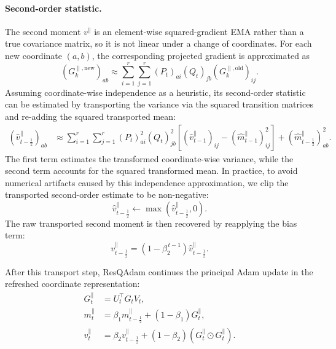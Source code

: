 \documentclass{article} %
\begin{document}
\paragraph{Second-order statistic.}
The second moment $v^{\parallel}$ is an element-wise squared-gradient EMA rather than a true covariance matrix, so it is not linear under a change of coordinates. For each new coordinate $(a,b)$, the corresponding projected gradient is approximated as
\begin{equation}
    \left(G_k^{\parallel,\mathrm{new}}\right)_{ab}
    \approx
    \sum_{i=1}^{r}\sum_{j=1}^{r}
    (P_t)_{ai} (Q_t)_{jb}
    \left(G_k^{\parallel,\mathrm{old}}\right)_{ij}.
\end{equation}
Assuming coordinate-wise independence as a heuristic, its second-order statistic can be estimated by transporting the variance via the squared transition matrices and re-adding the squared transported mean:
\begin{align}
    \left(\widehat{v}_{t-\frac{1}{2}}^{\parallel}\right)_{ab}
    &\approx
    \sum_{i=1}^{r}\sum_{j=1}^{r}
    (P_t)_{ai}^{2}(Q_t)_{jb}^{2}
    \left[
        \left(\widehat{v}_{t-1}^{\parallel}\right)_{ij}
        -
        \left(\widehat{m}_{t-1}^{\parallel}\right)_{ij}^{2}
    \right]
    +
    \left(\widehat{m}_{t-\frac{1}{2}}^{\parallel}\right)_{ab}^2 .
    \label{eq:resqadam_second_moment_transport}
\end{align}
The first term estimates the transformed coordinate-wise variance, while the second term accounts for the squared transformed mean. In practice, to avoid numerical artifacts caused by this independence approximation, we clip the transported second-order estimate to be non-negative:
\begin{equation}
    \widehat{v}_{t-\frac{1}{2}}^{\parallel}
    \leftarrow
    \max\left(
        \widehat{v}_{t-\frac{1}{2}}^{\parallel}, 0
    \right).
\end{equation}
The raw transported second moment is then recovered by reapplying the bias term:
\begin{equation}
    v_{t-\frac{1}{2}}^{\parallel}
    =
    \left(1-\beta_2^{\,t-1}\right)
    \widehat{v}_{t-\frac{1}{2}}^{\parallel} .
\end{equation}

After this transport step, ResQAdam continues the principal Adam update in the refreshed coordinate representation:
\begin{align}
    G_t^{\parallel} &= U_t^\top G_t V_t, \\
    m_t^{\parallel}
    &=
    \beta_1 m_{t-\frac{1}{2}}^{\parallel}
    +
    (1-\beta_1)G_t^{\parallel}, \\
    v_t^{\parallel}
    &=
    \beta_2 v_{t-\frac{1}{2}}^{\parallel}
    +
    (1-\beta_2)
    \left(G_t^{\parallel}\odot G_t^{\parallel}\right).
\end{align}
\end{document}
